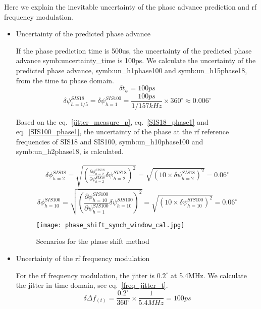 Here we explain the inevitable uncertainty of the phase advance prediction and rf frequency modulation. 
\begin{itemize}
\item Uncertainty of the predicted phase advance

If the phase prediction time is 500us, the uncertainty of the predicted phase advance \gls{symb:uncertainty_time} is 100ps. We calculate the uncertainty of the predicted phase advance, \gls{symb:un_h1phase100} and \gls{symb:un_h15phase18}, from the time to phase domain. 
\begin{equation} 
\delta t_\psi= 100ps
\label{jitter_measure_t}
\end{equation}
\begin{equation} 
\delta \psi_{h=1/5}^{SIS18}=\delta\psi_{h=1}^{SIS100}=
\frac {100ps}{1/157kHz} \times {360^{\circ}}\approx 0.006^\circ
\label{jitter_measure_p}
\end{equation}
 
Based on the eq.~\ref{jitter_measure_p}, eq.~\ref{SIS18_phase1} and eq.~\ref{SIS100_phase1}, the uncertainty of the phase at the rf reference frequencies of SIS18 and SIS100,
\gls{symb:un_h10phase100} and \gls{symb:un_h2phase18}, is calculated. 

\begin{equation}
\begin{aligned}
\delta \phi_{h=2}^{SIS18} = \sqrt {(\frac{\partial \phi_{h=2}^{SIS18}}{\partial \psi_{h=2}^{SIS18}} \delta \psi_{h=2}^{SIS18})^2}=\sqrt {(10 \times \delta \psi_{h=2}^{SIS18})^2}=0.06^\circ
\label{phi_jitter1}
\end{aligned}
\end{equation}
\begin{equation}
\delta \phi_{h=10}^{SIS100} = \sqrt {(\frac{\partial \phi_{h=10}^{SIS100}}{\partial \psi_{h=1}^{SIS100}} \delta \psi_{h=10}^{SIS100})^2}=\sqrt {(10 \times \delta \psi_{h=10}^{SIS100})^2}=0.06^\circ
\label{phi_jitter2}
\end{equation}


\begin{figure}[!htb]
   \centering   
   \texttt{[image: phase\_shift\_synch\_window\_cal.jpg]}
   \caption{Scenarios for the phase shift method}
   \label{phase_shift}
\end{figure}
\item Uncertainty of the rf frequency modulation

For the rf frequency modulation, the jitter is $0.2^\circ$ at 5.4MHz. We calculate the jitter in time domain, see eq.~\ref{freq_jitter_t}.
\begin{equation}
\delta \Delta f_{(t)} = \frac{0.2^\circ}{360^\circ} \times {\frac{1}{5.4MHz}}=100ps
\label{freq_jitter_t}
\end{equation}
%



\end{itemize}
